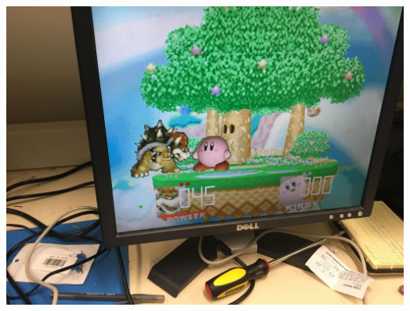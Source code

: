 \documentclass[12pt]{article} %
\begin{document}
\includegraphics[scale=0.1]{pic6}\\
\end{document}
